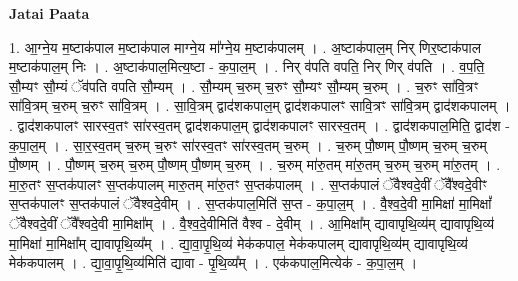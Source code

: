 \documentclass[17pt]{extarticle}
\begin{document}
\textbf{Jatai Paata} \newline

1. आ॒ग्ने॒य म॒ष्टाक॑पाल म॒ष्टाक॑पाल माग्ने॒य मा᳚ग्ने॒य म॒ष्टाक॑पालम् । . अ॒ष्टाक॑पाल॒म् निर् णिर॒ष्टाक॑पाल म॒ष्टाक॑पाल॒म् निः । . अ॒ष्टाक॑पाल॒मित्य॒ष्टा - क॒पा॒ल॒म् । . निर् व॑पति वपति॒ निर् णिर् व॑पति । . व॒प॒ति॒ सौ॒म्यꣳ सौ॒म्यं ॅव॑पति वपति सौ॒म्यम् । . सौ॒म्यम् च॒रुम् च॒रुꣳ सौ॒म्यꣳ सौ॒म्यम् च॒रुम् । . च॒रुꣳ सा॑वि॒त्रꣳ सा॑वि॒त्रम् च॒रुम् च॒रुꣳ सा॑वि॒त्रम् । . सा॒वि॒त्रम् द्वाद॑शकपाल॒म् द्वाद॑शकपालꣳ सावि॒त्रꣳ सा॑वि॒त्रम् द्वाद॑शकपालम् । . द्वाद॑शकपालꣳ सारस्व॒तꣳ सा॑रस्व॒तम् द्वाद॑शकपाल॒म् द्वाद॑शकपालꣳ सारस्व॒तम् । . द्वाद॑शकपाल॒मिति॒ द्वाद॑श - क॒पा॒ल॒म् । . सा॒र॒स्व॒तम् च॒रुम् च॒रुꣳ सा॑रस्व॒तꣳ सा॑रस्व॒तम् च॒रुम् । . च॒रुम् पौ॒ष्णम् पौ॒ष्णम् च॒रुम् च॒रुम् पौ॒ष्णम् । . पौ॒ष्णम् च॒रुम् च॒रुम् पौ॒ष्णम् पौ॒ष्णम् च॒रुम् । . च॒रुम् मा॑रु॒तम् मा॑रु॒तम् च॒रुम् च॒रुम् मा॑रु॒तम् । . मा॒रु॒तꣳ स॒प्तक॑पालꣳ स॒प्तक॑पालम् मारु॒तम् मा॑रु॒तꣳ स॒प्तक॑पालम् । . स॒प्तक॑पालं ॅवैश्वदे॒वीं ॅवै᳚श्वदे॒वीꣳ स॒प्तक॑पालꣳ स॒प्तक॑पालं ॅवैश्वदे॒वीम् । . स॒प्तक॑पाल॒मिति॑ स॒प्त - क॒पा॒ल॒म् । . वै॒श्व॒दे॒वी मा॒मिक्षा॑ मा॒मिक्षां᳚ ॅवैश्वदे॒वीं ॅवै᳚श्वदे॒वी मा॒मिक्षा᳚म् । . वै॒श्व॒दे॒वीमिति॑ वैश्व - दे॒वीम् । . आ॒मिक्षा᳚म् द्यावापृथि॒व्य॑म् द्यावापृथि॒व्य॑ मा॒मिक्षा॑ मा॒मिक्षा᳚म् द्यावापृथि॒व्य᳚म् । . द्या॒वा॒पृ॒थि॒व्य॑ मेक॑कपाल॒ मेक॑कपालम् द्यावापृथि॒व्य॑म् द्यावापृथि॒व्य॑ मेक॑कपालम् । . द्या॒वा॒पृ॒थि॒व्य॑मिति॑ द्यावा - पृ॒थि॒व्य᳚म् । . एक॑कपाल॒मित्येक॑ - क॒पा॒ल॒म् । \newline
\end{document}
